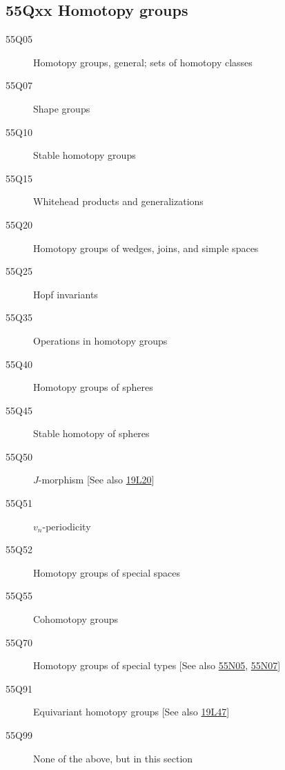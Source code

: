 \subsection*{55Qxx  Homotopy groups }\label{55Qxx}
\begin{description}  
\item [55Q05]\label{55Q05} Homotopy groups, general; sets of homotopy classes
\item [55Q07]\label{55Q07} Shape groups
\item [55Q10]\label{55Q10} Stable homotopy groups
\item [55Q15]\label{55Q15} Whitehead products and generalizations
\item [55Q20]\label{55Q20} Homotopy groups of wedges, joins, and simple spaces
\item [55Q25]\label{55Q25} Hopf invariants
\item [55Q35]\label{55Q35} Operations in homotopy groups
\item [55Q40]\label{55Q40} Homotopy groups of spheres
\item [55Q45]\label{55Q45} Stable homotopy of spheres
\item [55Q50]\label{55Q50} $J$-morphism [See also \hyperref[19L20]{19L20}]
\item [55Q51]\label{55Q51} $v_n$-periodicity
\item [55Q52]\label{55Q52} Homotopy groups of special spaces
\item [55Q55]\label{55Q55} Cohomotopy groups
\item [55Q70]\label{55Q70} Homotopy groups of special types [See also \hyperref[55N05]{55N05}, \hyperref[55N07]{55N07}]
\item [55Q91]\label{55Q91} Equivariant homotopy groups [See also \hyperref[19L47]{19L47}]
\item [55Q99]\label{55Q99} None of the above, but in this section
\end{description}
